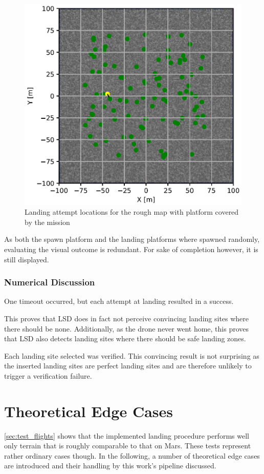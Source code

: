     \begin{figure}[h]
    \centering
    \includegraphics[scale=0.5]{images/evaluation/landing_rough_covered.png}
    \caption{Landing attempt locations for the rough map with platform covered by the mission}
    \label{fig:land_rough_covered} %
    \end{figure}

    As both the spawn platform and the landing platforms where spawned randomly, evaluating the visual outcome is redundant. For sake of completion however, it is still displayed.

    \subsubsection{Numerical Discussion}
    One timeout occurred, but each attempt at landing resulted in a success. 

    This proves that LSD does in fact not perceive convincing landing sites where there should be none. Additionally, as the drone never went home, this proves that LSD also detects landing sites where there should be safe landing zones.
    
    Each landing site selected was verified. This convincing result is not surprising as the inserted landing sites are perfect landing sites and are therefore unlikely to trigger a verification failure.

\section{Theoretical Edge Cases}
\cref{sec:test_flights} shows that the implemented landing procedure performs well only terrain that is roughly comparable to that on Mars. These tests represent rather ordinary cases though. In the following, a number of theoretical edge cases are introduced and their handling by this work's pipeline discussed.

